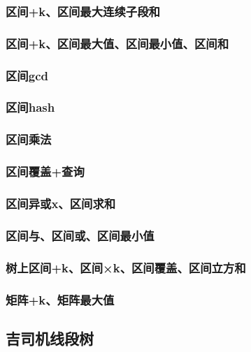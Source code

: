 \documentclass[10pt,a4paper]{article}
\begin{document}
	\subsubsection{区间+k、区间最大连续子段和}
	
	\subsubsection{区间+k、区间最大值、区间最小值、区间和}
	
	\subsubsection{区间gcd}
	
	\subsubsection{区间hash}
	
	\subsubsection{区间乘法}
	
	\subsubsection{区间覆盖+查询}
	
	\subsubsection{区间异或x、区间求和}
	
	\subsubsection{区间与、区间或、区间最小值}
	
	\subsubsection{树上区间+k、区间×k、区间覆盖、区间立方和}
	
	\subsubsection{矩阵+k、矩阵最大值}
	
	\subsection{吉司机线段树}
\end{document}
